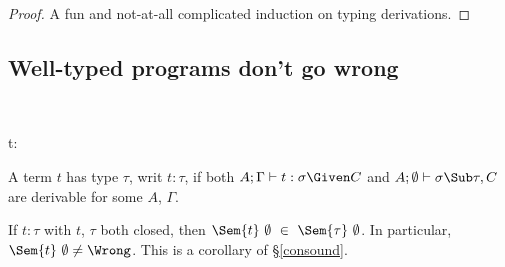 \documentclass{amsart}
\theoremstyle{definition}
\begin{document}
\begin{proof}
A fun and not-at-all complicated induction on typing derivations.
\end{proof}

\subsection{Well-typed programs don't go wrong}~

{t:\tau}

A term $t$ has type $\tau$, writ $t:\tau$, if both
$A;\Gamma\vdash t : \sigma\Given C$ and
$A;\emptyset\vdash\sigma\Sub\tau,C$ are derivable for some $A$,
$\Gamma$.

If $t:\tau$ with $t$, $\tau$ both closed, then
$\Sem{t}~\emptyset~\in~\Sem{\tau}~\emptyset$. In particular,
$\Sem{t}~\emptyset\neq\Wrong$. This is a corollary of
\S\ref{consound}.




\end{document}
